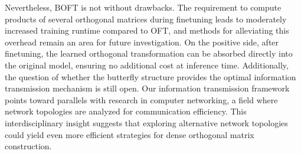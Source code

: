 Nevertheless, BOFT is not without drawbacks. The requirement to compute products of several orthogonal matrices during finetuning leads to moderately increased training runtime compared to OFT, and methods for alleviating this overhead remain an area for future investigation. On the positive side, after finetuning, the learned orthogonal transformation can be absorbed directly into the original model, ensuring no additional cost at inference time. Additionally, the question of whether the butterfly structure provides the optimal information transmission mechanism is still open. Our information transmission framework points toward parallels with research in computer networking, a field where network topologies are analyzed for communication efficiency. This interdisciplinary insight suggests that exploring alternative network topologies could yield even more efficient strategies for dense orthogonal matrix construction.

